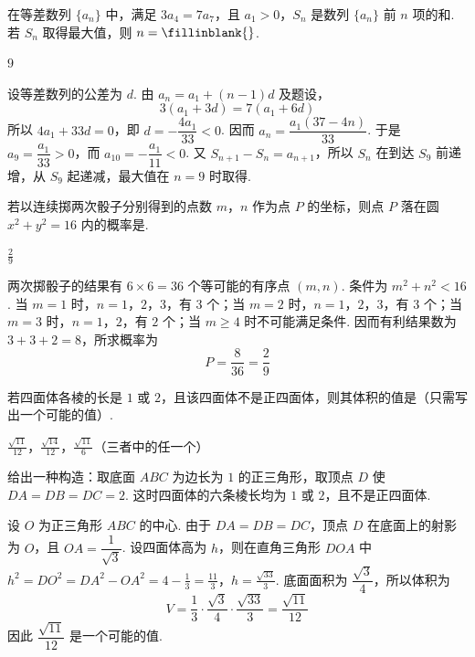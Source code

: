 \begin{problem}
在等差数列 \(\{a_n\}\) 中，满足 \(3a_4 = 7a_7\)，且 \(a_1 > 0\)，\(S_n\) 是数列 \(\{a_n\}\) 前 \(n\) 项的和. 若 \(S_n\) 取得最大值，则 \(n=\fillinblank{}\).
\end{problem}

\begin{answer}
\(9\)
\end{answer}

\begin{solution}
设等差数列的公差为 \(d\). 由 \(a_n=a_1+(n-1)d\) 及题设，
\[
3(a_1+3d)=7(a_1+6d)
\]
所以 \(4a_1+33d=0\)，即 \(d=-\dfrac{4a_1}{33}<0\). 因而 \(a_n=\dfrac{a_1(37-4n)}{33}\). 于是 \(a_9=\dfrac{a_1}{33}>0\)，而 \(a_{10}=-\dfrac{a_1}{11}<0\). 又 \(S_{n+1}-S_n=a_{n+1}\)，所以 \(S_n\) 在到达 \(S_9\) 前递增，从 \(S_9\) 起递减，最大值在 \(n=9\) 时取得.
\end{solution}

\begin{problem}
若以连续掷两次骰子分别得到的点数 \(m\)，\(n\) 作为点 \(P\) 的坐标，则点 \(P\) 落在圆 \(x^2 + y^2 = 16\) 内的概率是\fillinblank{}.
\end{problem}

\begin{answer}
\(\frac{2}{9}\)
\end{answer}

\begin{solution}
两次掷骰子的结果有 \(6\times6=36\) 个等可能的有序点 \((m,n)\). 条件为 \(m^2+n^2<16\). 当 \(m=1\) 时，\(n=1\)，\(2\)，\(3\)，有 \(3\) 个；当 \(m=2\) 时，\(n=1\)，\(2\)，\(3\)，有 \(3\) 个；当 \(m=3\) 时，\(n=1\)，\(2\)，有 \(2\) 个；当 \(m\ge4\) 时不可能满足条件. 因而有利结果数为 \(3+3+2=8\)，所求概率为
\[
P=\frac{8}{36}=\frac29
\]
\end{solution}

\begin{problem}
若四面体各棱的长是 \(1\) 或 \(2\)，且该四面体不是正四面体，则其体积的值是\fillinblank{}（只需写出一个可能的值）.
\end{problem}

\begin{answer}
\(\frac{\sqrt{11}}{12}\)，\(\frac{\sqrt{14}}{12}\)，\(\frac{\sqrt{11}}{6}\)（三者中的任一个）
\end{answer}

\begin{solution}
给出一种构造：取底面 \(ABC\) 为边长为 \(1\) 的正三角形，取顶点 \(D\) 使 \(DA=DB=DC=2\). 这时四面体的六条棱长均为 \(1\) 或 \(2\)，且不是正四面体.

设 \(O\) 为正三角形 \(ABC\) 的中心. 由于 \(DA=DB=DC\)，顶点 \(D\) 在底面上的射影为 \(O\)，且 \(OA=\dfrac1{\sqrt3}\). 设四面体高为 \(h\)，则在直角三角形 \(DOA\) 中
\(h^2=DO^2=DA^2-OA^2=4-\frac13=\frac{11}{3}\)，\(h=\frac{\sqrt{33}}3\).
底面面积为 \(\dfrac{\sqrt3}{4}\)，所以体积为
\[
V=\frac13\cdot\frac{\sqrt3}{4}\cdot\frac{\sqrt{33}}3=\frac{\sqrt{11}}{12}
\]
因此 \(\dfrac{\sqrt{11}}{12}\) 是一个可能的值.
\end{solution}

